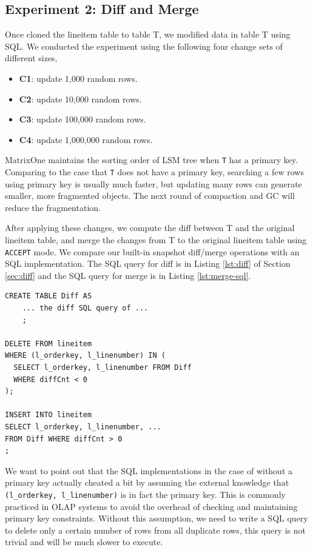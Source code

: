 \documentclass[sigconf,nonacm]{acmart} %
\begin{document}
\subsection{Experiment 2: Diff and Merge}
Once cloned the lineitem table to table T, we modified data in 
table T using SQL.  We conducted the experiment using the following
four change sets of different sizes,
\begin{itemize}
\item \textbf{C1}: update 1{,}000 random rows.
\item \textbf{C2}: update 10{,}000 random rows.
\item \textbf{C3}: update 100{,}000 random rows.
\item \textbf{C4}: update 1{,}000{,}000 random rows.
\end{itemize}
MatrixOne maintains the sorting order of LSM tree when \texttt{T} has a primary key.
Comparing to the case that \texttt{T} does not have a primary key,
searching a few rows using primary key is usually much faster, but updating many rows
can generate smaller, more fragmented objects.  The next round of compaction and GC 
will reduce the fragmentation.

After applying these changes, we compute the diff between T and the original 
lineitem table, and merge the changes from T to the original lineitem table
using \texttt{ACCEPT} mode.  We compare our built-in snapshot diff/merge 
operations with an SQL implementation.  The SQL query for diff is in 
Listing \ref{lst:diff} of Section \ref{sec:diff} and the SQL query for 
merge is in Listing \ref{lst:merge-sql}.

\begin{lstlisting}[label=lst:merge-sql,caption=SQL for Merge]
CREATE TABLE Diff AS
    ... the diff SQL query of ...
    ;

DELETE FROM lineitem
WHERE (l_orderkey, l_linenumber) IN (
  SELECT l_orderkey, l_linenumber FROM Diff 
  WHERE diffCnt < 0
);

INSERT INTO lineitem 
SELECT l_orderkey, l_linenumber, ... 
FROM Diff WHERE diffCnt > 0
;
\end{lstlisting}

We want to point out that the SQL implementations in the case of without 
a primary key actually cheated a bit by assuming the external 
knowledge that \texttt{(l\_orderkey, l\_linenumber)} is in fact
the primary key.  This is commonly practiced in OLAP systems to avoid 
the overhead of checking and maintaining primary key constraints.  
Without this assumption, we need to write a SQL query to delete 
only a certain number of rows from all duplicate rows, this query 
is not trivial and will be much slower to execute.
\end{document}
